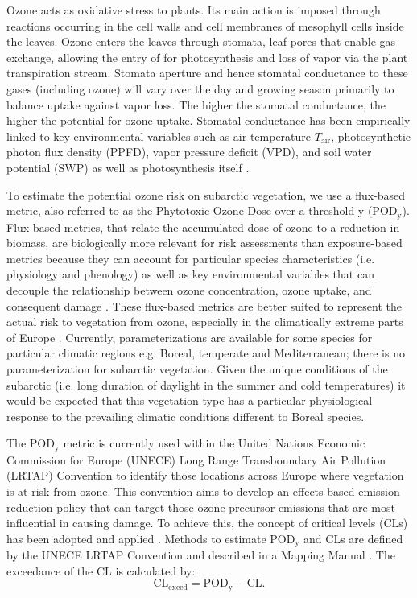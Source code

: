 \documentclass[bg, manuscript]{copernicus}
\begin{document}
Ozone acts as oxidative stress to plants. Its main action is imposed through reactions occurring in the cell walls and cell membranes of mesophyll cells inside the leaves. Ozone enters the leaves through stomata, leaf pores that enable gas exchange, allowing the entry of  for photosynthesis and loss of  vapor via the plant transpiration stream. Stomata aperture and hence stomatal conductance to these gases (including ozone) will vary over the day and growing season primarily to balance  uptake against  vapor loss. The higher the stomatal conductance, the higher the potential for ozone uptake. Stomatal conductance has been empirically linked to key environmental variables such as air temperature $T_\mathrm{air}$, photosynthetic photon flux density (PPFD), vapor pressure deficit (VPD), and soil water potential (SWP) as well as photosynthesis itself \citep[e.g.,][]{PTRS:Jarvis1976, BallBerry1987, Emberson2000, ICP:MappingManual2017}.

To estimate the potential ozone risk on subarctic vegetation, we use a flux-based metric, also referred to as the Phytotoxic Ozone Dose over a threshold y ($\mathrm{POD_y}$). Flux-based metrics, that relate the accumulated dose of ozone to a reduction in biomass, are biologically more relevant for risk assessments than exposure-based metrics because they can account for particular species characteristics (i.e. physiology and phenology) as well as key environmental variables that can decouple the relationship between ozone concentration, ozone uptake, and consequent damage \citep{PT:Emberson2020}. These flux-based metrics are better suited to represent the actual risk to vegetation from ozone, especially in the climatically extreme parts of Europe \citep{EP:Simpson2007,GCB:Mills2011,ICP:MappingManual2017}. Currently, parameterizations are available for some species for particular climatic regions e.g. Boreal, temperate and Mediterranean; there is no parameterization for subarctic vegetation. Given the unique conditions of the subarctic (i.e. long duration of daylight in the summer and cold temperatures) it would be expected that this vegetation type has a particular physiological response to the prevailing climatic conditions different to Boreal species.  

The $\mathrm{POD_y}$ metric is currently used within the United Nations Economic Commission for Europe (UNECE) Long Range Transboundary Air Pollution (LRTAP) Convention to identify those locations across Europe where vegetation is at risk from ozone. This convention aims to develop an effects-based emission reduction policy that can target those ozone precursor emissions that are most influential in causing damage. To achieve this, the concept of critical levels (CLs) has been adopted and applied \citep{Maas2016}. Methods to estimate $\mathrm{POD_y}$ and CLs are defined by the UNECE LRTAP Convention and described in a Mapping Manual \citep[most recent version]{ICP:MappingManual2017}. The exceedance of the CL is calculated by: 
%
\begin{equation}
  \mathrm{CL_{exeed}} = \mathrm{POD_y} - \mathrm{CL}.
\end{equation}
%
\end{document}
